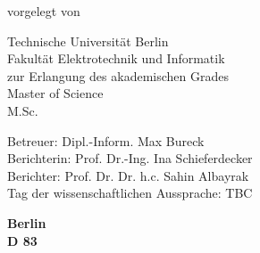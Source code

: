 \makeatletter

\vspace{1cm}

\begin{center}
{\huge\bf\@title}

\vspace{4cm}

{\large
	vorgelegt von \\
	{\Large\bf\@author}
}

\vspace{4cm}

Technische Universit\"{a}t Berlin \\
Fakult\"{a}t Elektrotechnik und Informatik \\
\medskip
zur Erlangung des akademischen Grades \\ 
Master of Science \\
M.Sc.
\end{center}

\vspace{2cm}

\begin{flushleft}
Betreuer: Dipl.-Inform. Max Bureck\\
Berichterin: Prof. Dr.-Ing. Ina Schieferdecker\\ 
Berichter: Prof. Dr. Dr. h.c. Sahin Albayrak\\ 
\medskip
\medskip
Tag der wissenschaftlichen Aussprache: TBC
\end{flushleft}

\vspace{2cm}

\begin{center}
{\large\bf
    Berlin \the\year \\
    \medskip
    D 83
    \medskip
}
\end{center}

\makeatother